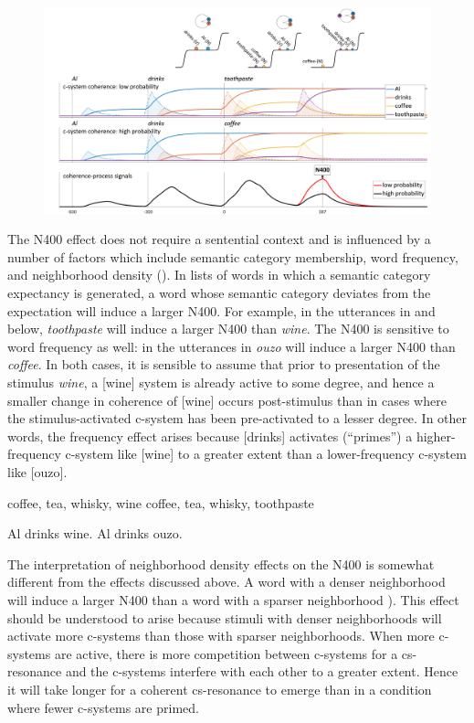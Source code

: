   
\begin{figure}
\includegraphics[width=\textwidth]{figures/Tilsen-img143.png}
\caption{\missingcaption}
\label{fig:6:24}
\end{figure}
 

The N400 effect does not require a sentential context and is influenced by a number of factors which include semantic category membership, word frequency, and neighborhood density (\citealt{KutasFedermeier2011,LauEtAl2008}). In lists of words in which a semantic category expectancy is generated, a word whose semantic category deviates from the expectation will induce a larger N400. For example, in the utterances in  and  below, \textit{toothpaste} will induce a larger N400 than \textit{wine}. The N400 is sensitive to word frequency as well: in the utterances in  \textit{ouzo} will induce a larger N400 than \textit{coffee}. In both cases, it is sensible to assume that prior to presentation of the stimulus \textit{wine}, a [wine] system is already active to some degree, and hence a smaller change in coherence of [wine] occurs post-stimulus than in cases where the stimulus-activated c-system has been pre-activated to a lesser degree. In other words, the frequency effect arises because [drinks] activates (“primes”) a higher-frequency c-system like [wine] to a greater extent than a lower-frequency c-system like [ouzo].

\ea\label{ex:6:1bis}
\ea\label{ex:6:1bisa} coffee, tea, whisky, wine
\ex\label{ex:6:1bisb}  coffee, tea, whisky, toothpaste
\z
\z

\ea\label{ex:6:2bis}
\ea\label{ex:6:2bisa} Al drinks wine.
\ex\label{ex:6:2bisb} Al drinks ouzo.
\z
\z

  The interpretation of neighborhood density effects on the N400 is somewhat different from the effects discussed above. A word with a denser neighborhood will induce a larger N400 than a word with a sparser neighborhood \citep{HolcombEtAl2002,MüllerEtAl2010}). This effect should be understood to arise because stimuli with denser neighborhoods will activate more c-systems than those with sparser neighborhoods. When more c-systems are active, there is more competition between c-systems for a cs-resonance and the c-systems interfere with each other to a greater extent. Hence it will take longer for a coherent cs-resonance to emerge than in a condition where fewer c-systems are primed. 

